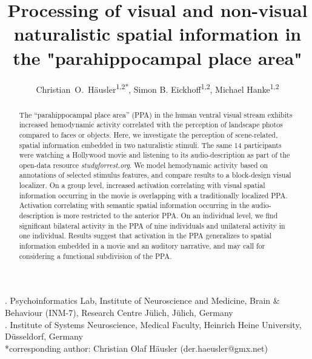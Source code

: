 \documentclass[english,11pt]{article}
\begin{document}




\title{Processing of visual and non-visual naturalistic spatial information in
  the "parahippocampal place area"}

\author{
    Christian~O.~Häusler\textsuperscript{1,2{*}},
    Simon B. Eickhoff\textsuperscript{1,2},
    Michael Hanke\textsuperscript{1,2}}

\maketitle
\thispagestyle{fancy}

. Psychoinformatics Lab, Institute of Neuroscience and Medicine, Brain \&
Behaviour (INM-7), Research Centre Jülich, Jülich, Germany\\
. Institute of Systems Neuroscience, Medical Faculty, Heinrich Heine University,
Düsseldorf, Germany\\
{*}corresponding author: Christian Olaf Häusler (der.haeusler@gmx.net)


\begin{abstract}
The ``parahippocampal place area'' (PPA) in the human ventral visual stream
exhibits increased hemodynamic activity correlated with the perception of
landscape photos compared to faces or objects.
Here, we investigate the perception of scene-related, spatial information embedded in two naturalistic stimuli.
%
The same 14 participants were watching a Hollywood movie and listening to its
audio-description as part of the open-data resource \textit{studyforrest.org}.
We model hemodynamic activity based on annotations of selected stimulus
features,
and compare results to a block-design visual localizer.
On a group level, increased activation correlating with visual spatial information
occurring in the movie is overlapping with a traditionally localized PPA.
Activation correlating with semantic spatial information occurring in the
audio-description is more restricted to the anterior PPA.
On an individual level, we find significant bilateral activity in the PPA
of nine individuals and unilateral activity in one individual.
Results suggest that activation in the PPA generalizes to spatial information
embedded in a movie and an auditory narrative, and may
call for considering a functional subdivision of the PPA.  \end{abstract}
\end{document}
